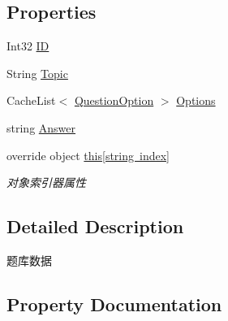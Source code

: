 \subsection*{Properties}
\begin{DoxyCompactItemize}
\item 
Int32 \mbox{\hyperlink{class_t_net_1_1_com_1_1_model_1_1_question_data_a52b3ff9fee8cf58e0b29c622d4e83c73}{ID}}
\item 
String \mbox{\hyperlink{class_t_net_1_1_com_1_1_model_1_1_question_data_aedde26404a46c823c1a4928d49568f56}{Topic}}
\item 
Cache\+List$<$ \mbox{\hyperlink{class_t_net_1_1_com_1_1_model_1_1_question_option}{Question\+Option}} $>$ \mbox{\hyperlink{class_t_net_1_1_com_1_1_model_1_1_question_data_a070fd30103270c7885dbe169a97d1273}{Options}}
\item 
string \mbox{\hyperlink{class_t_net_1_1_com_1_1_model_1_1_question_data_a1c97a8740783a2b23f98582c61d2892e}{Answer}}
\item 
override object \mbox{\hyperlink{class_t_net_1_1_com_1_1_model_1_1_question_data_ab7ec45a126a1947104b9d350524db3e5}{this\mbox{[}string index\mbox{]}}}
\begin{DoxyCompactList}\small\item\em 对象索引器属性 \end{DoxyCompactList}\end{DoxyCompactItemize}


\subsection{Detailed Description}
题库数据 



\subsection{Property Documentation}
\mbox{\label{class_t_net_1_1_com_1_1_model_1_1_question_data_a1c97a8740783a2b23f98582c61d2892e}} 

